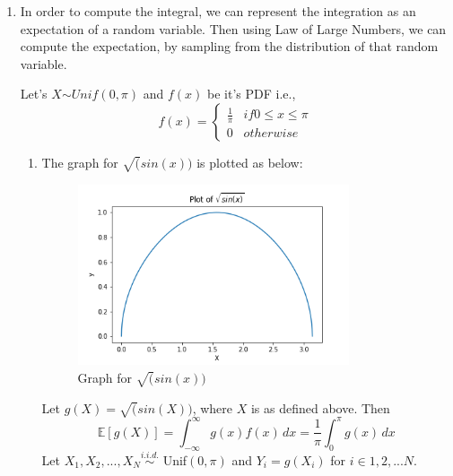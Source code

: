 \documentclass{article}
\begin{document}
\begin{enumerate}
    \par
	
	\noindent %

    \item In order to compute the integral, we can represent the integration as an expectation of a random 
    variable. Then using Law of Large Numbers, we can compute the expectation, by sampling from the distribution of that random variable.\par
	
	\noindent %
    Let's $X \stackrel{}{\sim} Unif(0, \pi)$ and $f(x)$ be it's PDF i.e.,
    \begin{equation}
    \nonumber
    f(x) = \begin{cases}
        \frac{1}{\pi} & if 0 \le x \le \pi \\
        0 & otherwise
    \end{cases}
    \end{equation} 
        \begin{enumerate}
            \item The graph for $\sqrt(sin(x))$ is plotted as below:
                \begin{figure}[H]
                    \begin{center}
                    \includegraphics[width=8cm]{Q3_1.png}
                    \end{center}
                    \caption{Graph for $\sqrt(sin(x))$}
                \end{figure}
                Let $g(X) = \sqrt(sin(X))$, where $X$ is as defined above. Then 
                \begin{equation}
                    \mathbb{E}[g(X)] = \int_{-\infty}^{\infty}g(x)f(x) \,dx =  \frac{1}{\pi}\int_{0}^{\pi}g(x) \,dx
                \end{equation}
                Let $X_{1}, X_{2}, ..., X_{N} \stackrel{i.i.d.}{\sim}$ Unif$(0, \pi)$ and $Y_{i} = g(X_{i})$ for $i \in {1, 2, ... N}$. 

\end{enumerate}
\end{enumerate}
\end{document}
